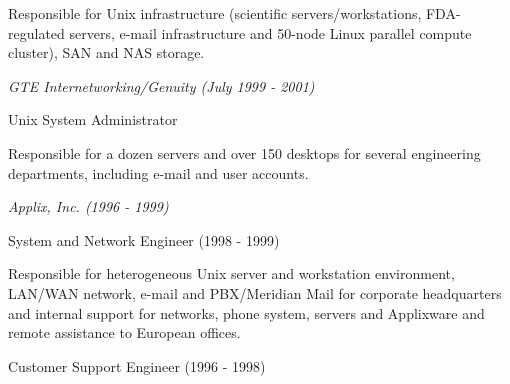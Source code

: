 \documentclass[11pt,article,oneside]{memoir}
\begin{document}
\ind \hspace{0.35in} \footnotesize Responsible for Unix infrastructure (scientific servers/workstations, FDA-regulated servers, e-mail infrastructure and 50-node Linux parallel compute cluster), SAN and NAS storage.

\vspace{-0.075in}

\normalsize

\bigskip
\noindent\emph{GTE Internetworking/Genuity (July 1999 - 2001)}

\ind \footnotesize Unix System Administrator

\ind \hspace{0.35in} \footnotesize Responsible for a dozen servers and over 150 desktops for several engineering departments, including e-mail and user accounts.

\vspace{-0.075in}

\normalsize

\bigskip
\noindent\emph{Applix, Inc. (1996 - 1999)}

\ind \footnotesize System and Network Engineer (1998 - 1999)

\ind \hspace{0.35in} \footnotesize Responsible for heterogeneous Unix server and workstation environment, LAN/WAN network, e-mail and PBX/Meridian Mail for
corporate headquarters and internal support for networks, phone system, servers and Applixware and remote assistance to European offices.

\ind \footnotesize Customer Support Engineer (1996 - 1998)






\end{document}
